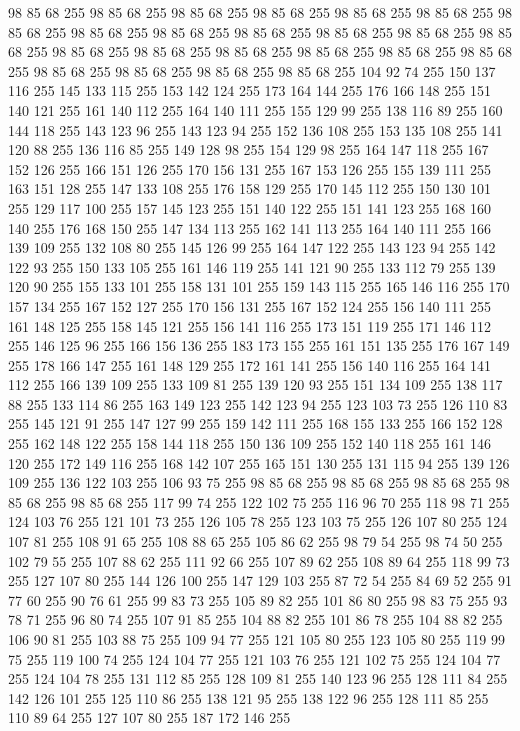98 85 68 255 98 85 68 255 98 85 68 255 98 85 68 255 98 85 68 255 98 85 68 255 98 85 68 255 98 85 68 255 98 85 68 255 98 85 68 255 98 85 68 255 98 85 68 255 98 85 68 255 98 85 68 255 98 85 68 255 98 85 68 255 98 85 68 255 98 85 68 255 98 85 68 255 98 85 68 255 98 85 68 255 98 85 68 255 98 85 68 255 104 92 74 255 150 137 116 255 145 133 115 255 153 142 124 255 173 164 144 255 176 166 148 255 151 140 121 255 161 140 112 255 164 140 111 255 155 129 99 255 138 116 89 255 160 144 118 255 143 123 96 255 143 123 94 255 152 136 108 255 153 135 108 255 141 120 88 255 136 116 85 255 149 128 98 255 154 129 98 255 164 147 118 255 167 152 126 255 166 151 126 255 170 156 131 255 167 153 126 255 155 139 111 255 163 151 128 255 147 133 108 255 176 158 129 255 170 145 112 255 150 130 101 255 129 117 100 255 157 145 123 255 151 140 122 255 151 141 123 255 168 160 140 255 176 168 150 255 147 134 113 255 162 141 113 255 164 140 111 255 166 139 109 255
132 108 80 255 145 126 99 255 164 147 122 255 143 123 94 255 142 122 93 255 150 133 105 255 161 146 119 255 141 121 90 255 133 112 79 255 139 120 90 255 155 133 101 255 158 131 101 255 159 143 115 255 165 146 116 255 170 157 134 255 167 152 127 255 170 156 131 255 167 152 124 255 156 140 111 255 161 148 125 255 158 145 121 255 156 141 116 255 173 151 119 255 171 146 112 255 146 125 96 255 166 156 136 255 183 173 155 255 161 151 135 255 176 167 149 255 178 166 147 255 161 148 129 255 172 161 141 255 156 140 116 255 164 141 112 255 166 139 109 255 133 109 81 255 139 120 93 255 151 134 109 255 138 117 88 255 133 114 86 255 163 149 123 255 142 123 94 255 123 103 73 255 126 110 83 255 145 121 91 255 147 127 99 255 159 142 111 255 168 155 133 255 166 152 128 255 162 148 122 255 158 144 118 255 150 136 109 255 152 140 118 255 161 146 120 255 172 149 116 255 168 142 107 255 165 151 130 255 131 115 94 255 139 126 109 255 136 122 103 255 106 93 75 255 98 85 68 255 98 85 68 255 98 85 68 255
98 85 68 255 98 85 68 255 117 99 74 255 122 102 75 255 116 96 70 255 118 98 71 255 124 103 76 255 121 101 73 255 126 105 78 255 123 103 75 255 126 107 80 255 124 107 81 255 108 91 65 255 108 88 65 255 105 86 62 255 98 79 54 255 98 74 50 255 102 79 55 255 107 88 62 255 111 92 66 255 107 89 62 255 108 89 64 255 118 99 73 255 127 107 80 255 144 126 100 255 147 129 103 255 87 72 54 255 84 69 52 255 91 77 60 255 90 76 61 255 99 83 73 255 105 89 82 255 101 86 80 255 98 83 75 255 93 78 71 255 96 80 74 255 107 91 85 255 104 88 82 255 101 86 78 255 104 88 82 255 106 90 81 255 103 88 75 255 109 94 77 255 121 105 80 255 123 105 80 255 119 99 75 255 119 100 74 255 124 104 77 255 121 103 76 255 121 102 75 255 124 104 77 255 124 104 78 255 131 112 85 255 128 109 81 255 140 123 96 255 128 111 84 255 142 126 101 255 125 110 86 255 138 121 95 255 138 122 96 255 128 111 85 255 110 89 64 255 127 107 80 255 187 172 146 255
